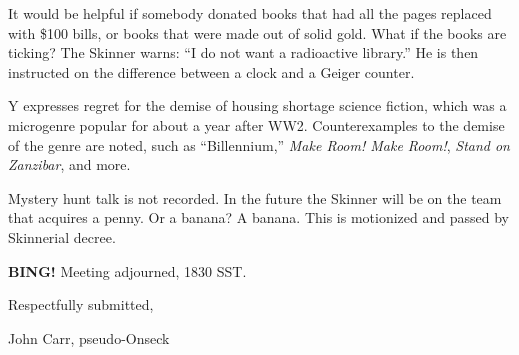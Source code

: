 \documentclass[10pt]{article}
\newcommand{\bing}{{\bf BING!} }
\begin{document}
It would be helpful if somebody donated books that had all the pages
replaced with \$100 bills, or books that were made out of solid gold.
What if the books are ticking?
The Skinner warns: ``I do not want a radioactive library.''  He is then
instructed on the difference between a clock and a Geiger counter.

Y expresses regret for the demise of housing shortage science fiction,
which was a microgenre popular for about a year after WW2.  Counterexamples
to the demise of the genre are noted, such as ``Billennium,''
{\em Make Room! Make Room!}, {\em Stand on Zanzibar}, and more.

Mystery hunt talk is not recorded.
In the future the Skinner will be on the team that acquires a penny.
Or a banana?  A banana.
This is motionized and passed by Skinnerial decree.

\bing
\noindent
Meeting adjourned, 1830 SST.

\vspace{18pt}

\centerline{Respectfully submitted,}
\centerline{John Carr, pseudo-Onseck}
\end{document}
